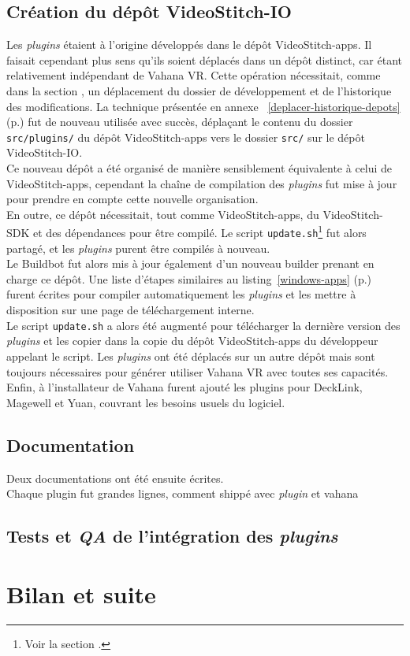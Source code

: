 \subsection{Création du dépôt VideoStitch-IO}
Les \textit{plugins} étaient à l'origine développés dans le dépôt VideoStitch-apps. Il faisait
cependant plus sens qu'ils soient déplacés dans un dépôt distinct, car étant relativement indépendant
de Vahana VR. Cette opération nécessitait, comme dans la section , un déplacement du dossier
de développement et de l'historique des modifications. La technique présentée en annexe~
\ref{deplacer-historique-depots} (p.\pageref{deplacer-historique-depots}) fut de
nouveau utilisée avec succès, déplaçant le contenu du dossier \texttt{src/plugins/}
du dépôt VideoStitch-apps vers le dossier \texttt{src/} sur le dépôt VideoStitch-IO.\\
\newline
Ce nouveau dépôt a été organisé de manière sensiblement équivalente à celui de VideoStitch-apps, 
cependant la chaîne de compilation des \textit{plugins} fut mise à jour pour prendre en compte
cette nouvelle organisation.\\
En outre, ce dépôt nécessitait, tout comme VideoStitch-apps, du VideoStitch-SDK et des dépendances
pour être compilé. Le script \texttt{update.sh}\footnote{Voir la section .}
fut alors partagé, et les \textit{plugins} purent être compilés à nouveau.\\
\newline
Le Buildbot fut alors mis à jour également d'un nouveau builder prenant en charge ce dépôt.
Une liste d'étapes similaires au listing~\ref{windows-apps} (p.\pageref{windows-apps}) furent écrites pour
compiler automatiquement les \textit{plugins} et les mettre à disposition sur une page de 
téléchargement interne.\\
Le script \texttt{update.sh} a alors été augmenté pour télécharger
la dernière version des \textit{plugins} et les copier dans la copie du dépôt VideoStitch-apps
du développeur appelant le script. Les \textit{plugins} ont été déplacés sur un autre dépôt
mais sont toujours nécessaires pour générer utiliser Vahana VR avec toutes ses
capacités.\\
Enfin, à l'installateur de Vahana furent ajouté les plugins pour DeckLink, Magewell
et Yuan, couvrant les besoins usuels du logiciel.

\subsection{Documentation}
Deux documentations ont été ensuite écrites.\\
Chaque plugin fut 
grandes lignes, comment shippé avec \textit{plugin} et vahana

\subsection{Tests et \textit{QA} de l'intégration des \textit{plugins}}


\section{Bilan et suite}

